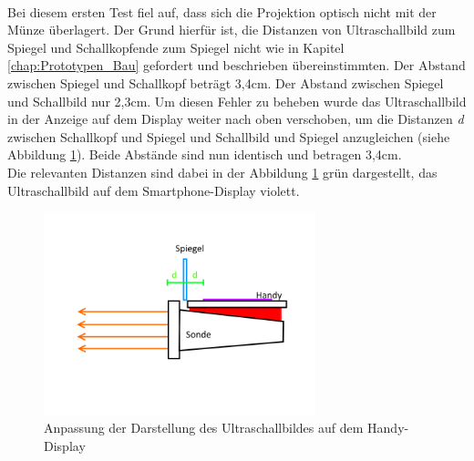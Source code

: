 ~\\
Bei diesem ersten Test fiel auf, dass sich die Projektion optisch nicht mit der Münze überlagert. Der Grund hierfür ist, die Distanzen von Ultraschallbild zum Spiegel und Schallkopfende zum Spiegel nicht wie in Kapitel \ref{chap:Prototypen_Bau} gefordert und beschrieben übereinstimmten. Der Abstand zwischen Spiegel und Schallkopf beträgt 3,4cm. Der Abstand zwischen Spiegel und Schallbild nur 2,3cm. Um diesen Fehler zu beheben wurde das Ultraschallbild in der Anzeige auf dem Display weiter nach oben verschoben, um die Distanzen \textit{d} zwischen Schallkopf und Spiegel und Schallbild und Spiegel anzugleichen (siehe Abbildung \ref{fig:Prototyp_Evaluierung}). Beide Abstände sind nun identisch und betragen 3,4cm.
\\
Die relevanten Distanzen sind dabei in der Abbildung \ref{fig:Prototyp_Evaluierung} grün dargestellt, das Ultraschallbild auf dem Smartphone-Display violett.
\clearpage
\begin{figure}[h]
	\centering
	\includegraphics*[width=0.7\textwidth]{Bilder/Evaluation/Prototyp.png}
	\caption{Anpassung der Darstellung des Ultraschallbildes auf dem Handy-Display}
	\label{fig:Prototyp_Evaluierung}
\end{figure}

